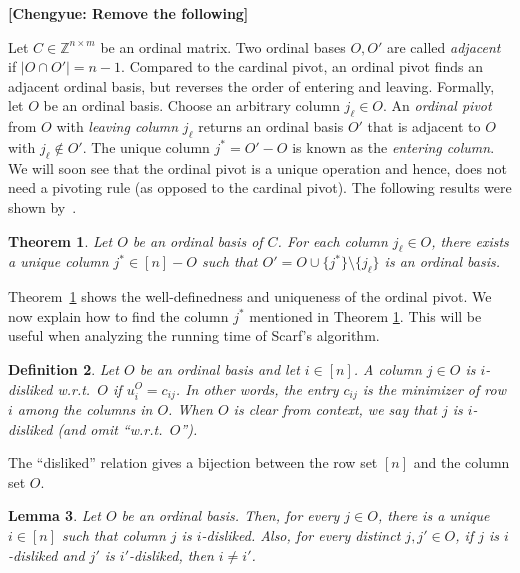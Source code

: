 \documentclass[11pt]{article}
\newcommand{\cnote}[1]{{\bf{\color{red}[\tiny Chengyue: #1]}}}
\newtheorem{theorem}{Theorem}
\newtheorem{lemma}[theorem]{Lemma}
\newtheorem{definition}[theorem]{Definition}
\begin{document}
\iffalse
\cnote{Remove the following}


Let $C\in\mathbb{Z}^{n\times m}$ be an ordinal matrix. Two ordinal bases $O,O'$ are called \emph{adjacent} if $|O\cap O'|=n-1$. Compared to the cardinal pivot, an ordinal pivot finds an adjacent ordinal basis, but reverses the order of entering and leaving. Formally, let $O$ be an ordinal basis. Choose an arbitrary column $j_\ell\in O$. An \emph{ordinal pivot} from $O$ with \emph{leaving column} $j_\ell$ returns an ordinal basis $O'$ that is adjacent to $O$ with $j_\ell\notin O'$. The unique column $j^*= O'-O$ is known as the \emph{entering column}. We will soon see that the ordinal pivot is a unique operation and hence, does not need a pivoting rule (as opposed to the cardinal pivot). The following results were shown by~\cite{scarf1967core}.


\begin{theorem}\label{thm:ordin-pivot}
    Let $O$ be an ordinal basis of $C$. For each column $j_\ell\in O$, there exists a unique column $j^*\in[n]-O$ such that $O'=O\cup\{j^*\}\setminus\{j_\ell\}$ is an ordinal basis.
\end{theorem}

























Theorem~\ref{thm:ordin-pivot} shows the well-definedness and uniqueness of the ordinal pivot. We now explain how to find the column $j^*$ mentioned in Theorem \ref{thm:ordin-pivot}. This will be useful when analyzing the running time of Scarf's algorithm.


\begin{definition}
    Let $O$ be an ordinal basis and let $i\in[n]$. A column $j\in O$ is \emph{$i$-disliked} w.r.t.~$O$ if $u_i^O=c_{ij}$. In other words, the entry $c_{ij}$ is the minimizer of row $i$ among the columns in $O$. When $O$ is clear from context, we say that $j$ is $i$-disliked (and omit ``w.r.t.~$O$'').
\end{definition}

The ``disliked'' relation gives a bijection between the row set $[n]$ and the column set $O$.
\begin{lemma}\label{lem:disliked-oneone}
    Let $O$ be an ordinal basis. Then, for every $j\in O$, there is a unique $i\in[n]$ such that column $j$ is $i$-disliked. Also, for every distinct $j,j'\in O$, if $j$ is $i$-disliked and $j'$ is $i'$-disliked, then $i\neq i'$.
\end{lemma}
\end{document}
